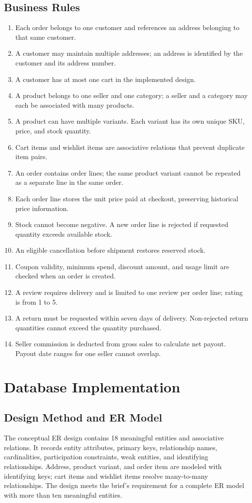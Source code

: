 \documentclass[11pt,a4paper,oneside]{report}
\begin{document}
\section{Business Rules}
\begin{enumerate}
 \item Each order belongs to one customer and references an address belonging to that same customer.
 \item A customer may maintain multiple addresses; an address is identified by the customer and its address number.
 \item A customer has at most one cart in the implemented design.
 \item A product belongs to one seller and one category; a seller and a category may each be associated with many products.
 \item A product can have multiple variants. Each variant has its own unique SKU, price, and stock quantity.
 \item Cart items and wishlist items are associative relations that prevent duplicate item pairs.
 \item An order contains order lines; the same product variant cannot be repeated as a separate line in the same order.
 \item Each order line stores the unit price paid at checkout, preserving historical price information.
 \item Stock cannot become negative. A new order line is rejected if requested quantity exceeds available stock.
 \item An eligible cancellation before shipment restores reserved stock.
 \item Coupon validity, minimum spend, discount amount, and usage limit are checked when an order is created.
 \item A review requires delivery and is limited to one review per order line; rating is from 1 to 5.
 \item A return must be requested within seven days of delivery. Non-rejected return quantities cannot exceed the quantity purchased.
 \item Seller commission is deducted from gross sales to calculate net payout. Payout date ranges for one seller cannot overlap.
\end{enumerate}

\chapter{Database Implementation}
\section{Design Method and ER Model}
The conceptual ER design contains 18 meaningful entities and associative relations. It records entity attributes, primary keys, relationship names, cardinalities, participation constraints, weak entities, and identifying relationships. Address, product variant, and order item are modeled with identifying keys; cart items and wishlist items resolve many-to-many relationships. The design meets the brief's requirement for a complete ER model with more than ten meaningful entities.
\end{document}
